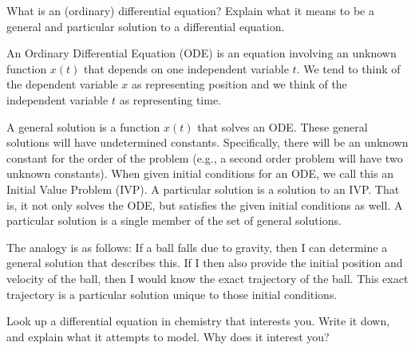 \documentclass[12pt]{article} %
\begin{document}
\begin{problem}
    What is an (ordinary) differential equation? Explain what it means to be a general and particular solution to a differential equation.
\end{problem}
\begin{solution}
    An Ordinary Differential Equation (ODE) is an equation involving an unknown function $x(t)$ that depends on one independent variable $t$.  We tend to think of the dependent variable $x$ as representing position and we think of the independent variable $t$ as representing time.

    A general solution is a function $x(t)$ that solves an ODE. These general solutions will have undetermined constants.  Specifically, there will be an unknown constant for the order of the problem (e.g., a second order problem will have two unknown constants). When given initial conditions for an ODE, we call this an Initial Value Problem (IVP).  A particular solution is a solution to an IVP. That is, it not only solves the ODE, but satisfies the given initial conditions as well.  A particular solution is a single member of the set of general solutions.  

    The analogy is as follows: If a ball falls due to gravity, then I can determine a general solution that describes this.   If I then also provide the initial position and velocity of the ball, then I would know the exact trajectory of the ball.  This exact trajectory is a particular solution unique to those initial conditions.
\end{solution}


\newpage

\begin{problem}
    Look up a differential equation in chemistry that interests you.  Write it down, and explain what it attempts to model. Why does it interest you?
\end{problem}
\end{document}
